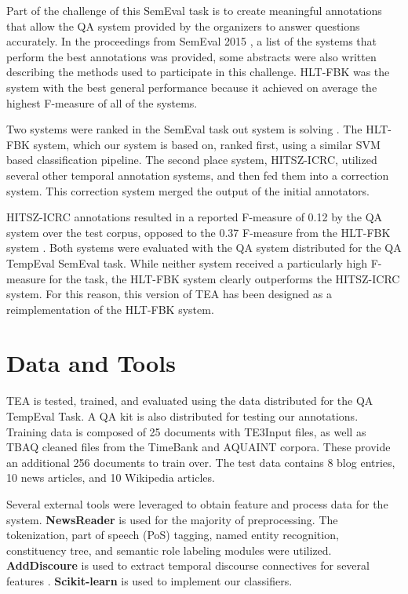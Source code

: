 \documentclass[11pt,letterpaper]{article}
\begin{document}
Part of the challenge of this SemEval task is to create meaningful annotations that allow the QA system provided by the organizers to answer questions accurately. In the proceedings from SemEval 2015 \cite{Llorens:16}, a list of the systems that perform the best annotations was provided, some abstracts were also written describing the methods used to participate in this challenge. HLT-FBK was the system with the best general performance because it achieved on average the highest F-measure of all of the systems.

Two systems were ranked in the SemEval task out system is solving \cite{Llorens:16}. The HLT-FBK system, which our system is based on, ranked first, using a similar SVM based classification pipeline. The second place system, HITSZ-ICRC, utilized several other temporal annotation systems, and then fed them into a correction system. This correction system merged the output of the initial annotators.

HITSZ-ICRC annotations resulted in a reported F-measure of 0.12 by the QA system over the test corpus, opposed to the 0.37 F-measure from the HLT-FBK system \cite{Llorens:16}. Both systems were evaluated with the QA system distributed for the QA TempEval SemEval task. While neither system received a particularly high F-measure for the task, the HLT-FBK system clearly outperforms the HITSZ-ICRC system. For this reason, this version of TEA has been designed as a reimplementation of the HLT-FBK system. 

\section{Data and Tools}

TEA is tested, trained, and evaluated using the data distributed for the QA TempEval Task. A QA kit is also distributed for testing our annotations. Training data is composed of 25 documents with TE3Input files, as well as TBAQ cleaned files from the TimeBank and AQUAINT corpora. These provide an additional 256 documents to train over. The test data contains 8 blog entries, 10 news articles, and 10 Wikipedia articles.

Several external tools were leveraged to obtain feature and process data for the system. \textbf{NewsReader} is used for the majority of preprocessing. The tokenization, part of speech (PoS) tagging, named entity recognition, constituency tree, and semantic role labeling modules were utilized. \textbf{AddDiscoure} is used to extract temporal discourse connectives for several features \cite{Pitler:09}. \textbf{Scikit-learn} is used to implement our classifiers.
\end{document}
